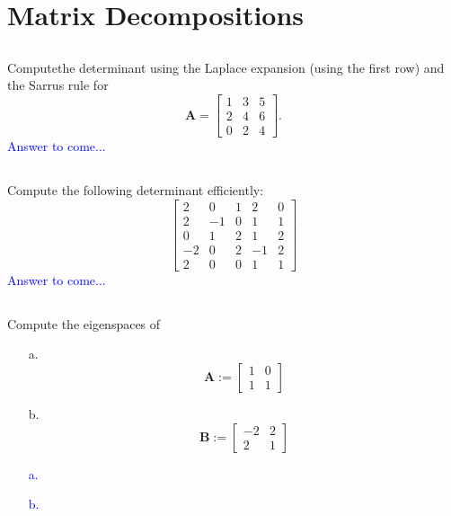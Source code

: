\documentclass[a4paper,12pt]{article}
\newcommand{\M}[1]{ \begin{bmatrix} #1 \end{bmatrix} }
\newcommand{\matA}{\textbf{A}}
\newcommand{\matB}{\textbf{B}}
\begin{document}
\section{Matrix Decompositions}
\subsection{}
Computethe determinant using the Laplace expansion (using the first row) and the Sarrus rule for
$$\matA = \M{1&3&5\\2&4&6\\0&2&4}.$$
\textcolor{blue}{
Answer to come...
}
\subsection{}
Compute the following determinant efficiently:
$$\M{2 &0&1&2&0\\
         2 &-1&0&1&1\\
         0 &1&2&1&2\\
         -2&0&2&-1&2\\
         2 &0&0&1&1}$$
\textcolor{blue}{
Answer to come...
}
\subsection{}
Compute the eigenspaces of
\begin{itemize}
 \item [a.] $$\matA := \M{1&0\\1&1}$$
 \item [b.] $$\matB := \M{-2&2\\2&1}$$
\end{itemize}
\textcolor{blue}{
\begin{itemize}
 \item [a.]
 \item [b.]
\end{itemize}
}
\end{document}
